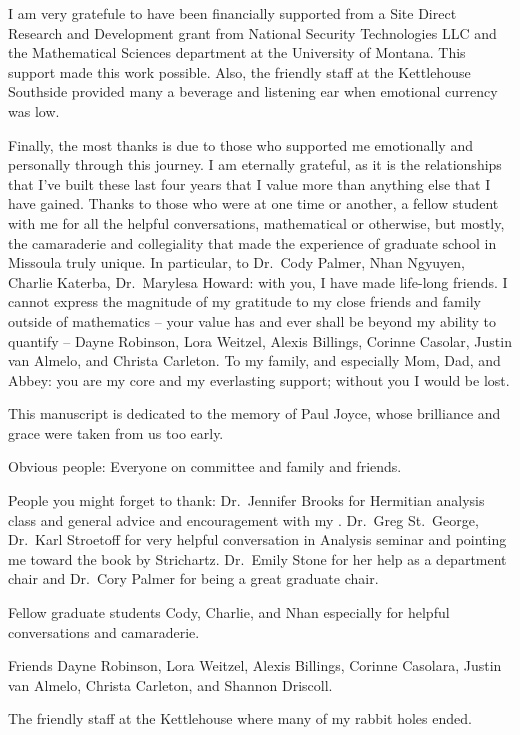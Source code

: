 I am very gratefule to have been financially supported from a Site Direct Research and Development grant from National Security Technologies LLC and the Mathematical Sciences department at the University of Montana.
This support made this work possible.
Also, the friendly staff at the Kettlehouse Southside provided many a beverage and listening ear when emotional currency was low.

Finally, the most thanks is due to those who supported me emotionally and personally through this journey.  
I am eternally grateful, as it is the relationships that I've built these last four years that I value more than anything else that I have gained.
Thanks to those who were at one time or another, a fellow student with me for all the helpful conversations, mathematical or otherwise, but mostly, the camaraderie and collegiality that made the experience of graduate school in Missoula truly unique.
In particular, to Dr.~Cody Palmer, Nhan Ngyuyen, Charlie Katerba, Dr.~Marylesa Howard: with you, I have made life-long friends. 
I cannot express the magnitude of my gratitude to my close friends and family outside of mathematics -- your value has and ever shall be beyond my ability to quantify -- Dayne Robinson, Lora Weitzel, Alexis Billings, Corinne Casolar, Justin van Almelo, and Christa Carleton.
To my family, and especially Mom, Dad, and Abbey: you are my core and my everlasting support; without you I would be lost.

This manuscript is dedicated to the memory of Paul Joyce, whose brilliance and grace were taken from us too early.

\begin{com}
  Obvious people: Everyone on committee and family and friends.

  People you might forget to thank: 
  Dr.~Jennifer Brooks for Hermitian analysis class and general advice and encouragement with my .
  Dr.~Greg St.~George, Dr.~Karl Stroetoff for very helpful conversation in Analysis seminar and pointing me toward the book by Strichartz.
  Dr.~Emily Stone for her help as a department chair and Dr.~Cory Palmer for being a great graduate chair.

  Fellow graduate students Cody, Charlie, and Nhan especially for helpful conversations and camaraderie.

  Friends Dayne Robinson, Lora Weitzel, Alexis Billings, Corinne Casolara, Justin van Almelo, Christa Carleton, and Shannon Driscoll.

  The friendly staff at the Kettlehouse where many of my rabbit holes ended.
\end{com}
